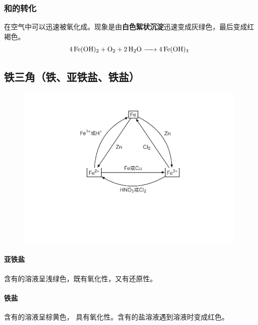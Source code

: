 \subsubsection{和的转化}
在空气中可以迅速被氧化成。现象是由\textbf{白色絮状沉淀}迅速变成\textcolor[rgb]{0.231,0.301,0.219}{灰绿色}，最后变成\textcolor[rgb]{0.541,0.149,0.078}{红褐色}。
$$\ce{4Fe(OH)2 + O2 + 2H2O -> 4Fe(OH)3}$$

\subsection{铁三角（铁、亚铁盐、铁盐）}
\begin{figure}[h]
\centering
\includegraphics[scale=0.8]{res/Fe.pdf}
\end{figure}

\paragraph{亚铁盐}
含有的溶液呈\textcolor[rgb]{0.625,0.8,0.7}{浅绿色}，既有氧化性，又有还原性。
\paragraph{铁盐}
含有的溶液呈\textcolor[rgb]{0.835,0.611,0.247}{棕黄色}， 具有氧化性。含有的盐溶液遇到溶液时变成红色。
